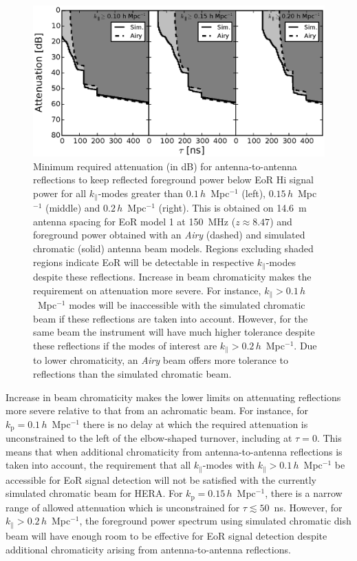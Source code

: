 \documentclass[preprint2,iop,numberedappendix,twocolappendix,appendixfloats]{emulateapj}
\begin{document}
\begin{figure}[htb]
  \centering
  \includegraphics[width=\linewidth]{f4.eps}
  \caption{Minimum required attenuation (in dB) for antenna-to-antenna reflections to keep reflected foreground power below EoR H{\sc i} signal power for all $k_\parallel$-modes greater than $0.1\,h$~Mpc$^{-1}$ (left), $0.15\,h$~Mpc$^{-1}$ (middle) and $0.2\,h$~Mpc$^{-1}$ (right). This is obtained on 14.6~m antenna spacing for EoR model 1 at 150~MHz ($z\approx 8.47$) and foreground power obtained with an {\it Airy} (dashed) and simulated chromatic (solid) antenna beam models. Regions excluding shaded regions indicate EoR will be detectable in respective $k_\parallel$-modes despite these reflections. Increase in beam chromaticity makes the requirement on attenuation more severe. For instance, $k_\parallel > 0.1\,h$~Mpc$^{-1}$ modes will be inaccessible with the simulated chromatic beam if these reflections are taken into account. However, for the same beam the instrument will have much higher tolerance despite these reflections if the modes of interest are $k_\parallel > 0.2\,h$~Mpc$^{-1}$. Due to lower chromaticity, an {\it Airy} beam offers more tolerance to reflections than the simulated chromatic beam.}
\label{fig:fg-reflections}
\end{figure}

Increase in beam chromaticity makes the lower limits on attenuating reflections more severe relative to that from an achromatic beam. For instance, for $k_\textrm{p}=0.1\,h$~Mpc$^{-1}$ there is no delay at which the required attenuation is unconstrained to the left of the elbow-shaped turnover, including at $\tau=0$. This means that when additional chromaticity from antenna-to-antenna reflections is taken into account, the requirement that all $k_\parallel$-modes with $k_\parallel > 0.1\,h$~Mpc$^{-1}$ be accessible for EoR signal detection will not be satisfied with the currently simulated chromatic beam for HERA. For $k_\textrm{p}=0.15\,h$~Mpc$^{-1}$, there is a narrow range of allowed attenuation which is unconstrained for $\tau \lesssim 50$~ns. However, for $k_\parallel > 0.2\,h$~Mpc$^{-1}$, the foreground power spectrum using simulated chromatic dish beam will have enough room to be effective for EoR signal detection despite additional chromaticity arising from antenna-to-antenna reflections. 
\end{document}
